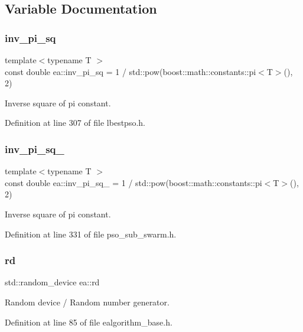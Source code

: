 \subsection{Variable Documentation}
\mbox{\label{namespaceea_a0a68157259a48341f23eeffca8a1d748}} 
\subsubsection{\texorpdfstring{inv\+\_\+pi\+\_\+sq}{inv\_pi\_sq}}
{\footnotesize\ttfamily template$<$typename T $>$ \\
const double ea\+::inv\+\_\+pi\+\_\+sq = 1 / std\+::pow(boost\+::math\+::constants\+::pi$<$T$>$(), 2)}



Inverse square of pi constant. 



Definition at line 307 of file lbestpso.\+h.

\mbox{\label{namespaceea_aceb1a704bbda5c44541cd98184c2c224}} 
\subsubsection{\texorpdfstring{inv\+\_\+pi\+\_\+sq\+\_}{inv\_pi\_sq\_2}}
{\footnotesize\ttfamily template$<$typename T $>$ \\
const double ea\+::inv\+\_\+pi\+\_\+sq\+\_ = 1 / std\+::pow(boost\+::math\+::constants\+::pi$<$T$>$(), 2)}



Inverse square of pi constant. 



Definition at line 331 of file pso\+\_\+sub\+\_\+swarm.\+h.

\mbox{\label{namespaceea_a0d4adcfbf42f88a74097673d4564f757}} 
\subsubsection{\texorpdfstring{rd}{rd}}
{\footnotesize\ttfamily std\+::random\+\_\+device ea\+::rd}



Random device / Random number generator. 



Definition at line 85 of file ealgorithm\+\_\+base.\+h.


